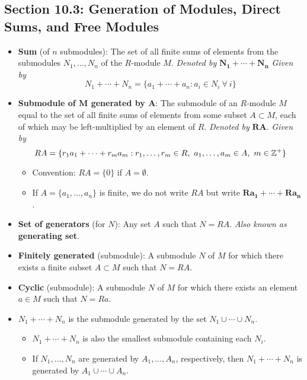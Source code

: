 \documentclass[../notes.tex]{subfiles}
\begin{document}
\subsection*{Section 10.3: Generation of Modules, Direct Sums, and Free Modules}
\begin{itemize}
    \item {}\textbf{Sum} (of $n$ submodules): The set of all finite sums of elements from the submodules $N_1,\dots,N_n$ of the $R$-module $M$. \emph{Denoted by} $\bm{N_1+\cdots+N_n}$ \emph{Given by}
    \begin{equation*}
        N_1+\cdots+N_n = \{a_1+\cdots+a_n:a_i\in N_i\ \forall\ i\}
    \end{equation*}
    \item \textbf{Submodule of $\bm{M}$ generated by $\bm{A}$}: The submodule of an $R$-module $M$ equal to the set of all finite sums of elements from some subset $A\subset M$, each of which may be left-multiplied by an element of $R$. \emph{Denoted by} $\bm{RA}$. \emph{Given by}
    \begin{equation*}
        RA = \{r_1a_1+\cdots+r_ma_m:r_1,\dots,r_m\in R,\ a_1,\dots,a_m\in A,\ m\in\Z^+\}
    \end{equation*}
    \begin{itemize}
        \item Convention: $RA=\{0\}$ if $A=\emptyset$.
        \item If $A=\{a_1,\dots,a_n\}$ is finite, we do not write $RA$ but write $\bm{Ra_1+\cdots+Ra_n}$.
    \end{itemize}
    \item \textbf{Set of generators} (for $N$): Any set $A$ such that $N=RA$. \emph{Also known as} \textbf{generating set}.
    \item \textbf{Finitely generated} (submodule): A submodule $N$ of $M$ for which there exists a finite subset $A\subset M$ such that $N=RA$.
    \item \textbf{Cyclic} (submodule): A submodule $N$ of $M$ for which there exists an element $a\in M$ such that $N=Ra$.
    \item $N_1+\cdots+N_n$ is the submodule generated by the set $N_1\cup\cdots\cup N_n$.
    \begin{itemize}
        \item $N_1+\cdots+N_n$ is also the smallest submodule containing each $N_i$.
        \item If $N_1,\dots,N_n$ are generated by $A_1,\dots,A_n$, respectively, then $N_1+\cdots+N_n$ is generated by $A_1\cup\cdots\cup A_n$.

\end{itemize}
\end{itemize}
\end{document}
